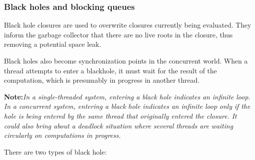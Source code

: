 \documentclass[11pt]{article}
\newcommand{\note}[1]{{{\bf Note:}\sl #1}}
\begin{document}
\subsubsection{Black holes and blocking queues}
\label{sec:BLACKHOLE}
\label{sec:BLACKHOLE_BQ}

Black hole closures are used to overwrite closures currently being
evaluated. They inform the garbage collector that there are no live
roots in the closure, thus removing a potential space leak.  

Black holes also become synchronization points in the concurrent
world.  When a thread attempts to enter a blackhole, it must wait for
the result of the computation, which is presumably in progress in
another thread.

\note{In a single-threaded system, entering a black hole indicates an
infinite loop.  In a concurrent system, entering a black hole
indicates an infinite loop only if the hole is being entered by the
same thread that originally entered the closure.  It could also bring
about a deadlock situation where several threads are waiting
circularly on computations in progress.}

There are two types of black hole:
\end{document}

